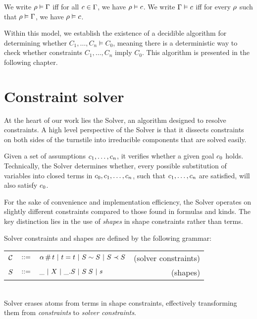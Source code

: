\documentclass[english, mgr]{iithesis}
\renewcommand{\it}[1]{\textit{#1}}
\begin{document}
We write $\rho \vDash \Gamma$ iff for all $c \in \Gamma$,
we have $\rho \vDash c$.
We write $\Gamma \vDash c$ iff
for every $\rho$ such that $\rho \vDash \Gamma$,
we have $\rho \vDash c$.

Within this model, we establish the existence of a decidible algorithm for determining whether $C_1, \ldots, C_n \models C_0$, meaning there is a deterministic way to check whether constraints $C_1, \ldots, C_n$ imply $C_0$. This algorithm is presented in the following chapter.


\chapter{Constraint solver}
At the heart of our work lies the Solver, an algorithm designed to resolve constraints.
A high level perspective of the Solver is that it dissects constraints on both sides of the turnstile into irreducible components that are solved easily.

Given a set of assumptions $c_1, \dots, c_n$, it verifies whether a given goal $c_0$ holds.
Technically, the Solver determines whether,
every possible substitution of variables into closed terms in $c_0, c_1, \dots, c_n$,
such that $c_1, \dots, c_n$ are satisfied, will also satisfy $c_0$.

For the sake of convenience and implementation efficiency, the Solver operates
on slightly different constraints compared to those found in formulas and kinds.
The key distinction lies in the use of \it{shapes} in shape constraints rather than terms.

Solver constraints and shapes are defined by the following grammar: \\
\begin{tabular}{rclr}
  $\mathcal{C}$ & $::=$ & $\alpha \,\#\, t
  \ |\  t = t
  \ |\  S \sim S
  \ |\  S \prec S$
      & (solver constraints) \\
  $S$      & $::=$ & $\_
                 \ |\   X
                 \ |\  \_. S
                 \ |\  S \; S
                 \ |\  s$
      & (shapes)
\end{tabular}\\
Solver erases atoms from terms in shape constraints,
effectively transforming them from \it{constraints} to \it{solver constraints}.
\end{document}
